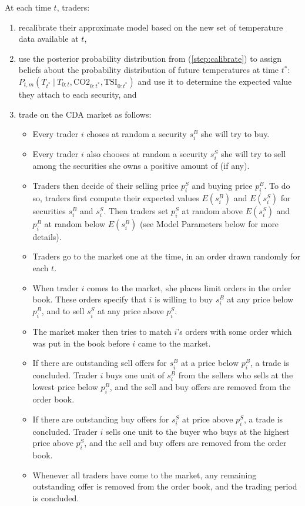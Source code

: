 \documentclass{wscpaperproc}\usepackage[]{graphicx}\usepackage[]{color}
\begin{document}
 At each time $t$, traders:
\begin{enumerate}
\item  recalibrate their approximate model based on the new set of temperature data available at $t$,
\label{step:calibrate}
\item  use the posterior probability distribution from (\ref{step:calibrate}) to 
assign beliefs about the probability distribution of future temperatures at time $t^*$: 
$P_{t,m}({T}_{t^*} ~|~ {T}_{0:t}, \text{CO2}_{0:t^*}, \text{TSI}_{0:t^*})$ 
and use it to determine the expected value they attach to each security, and
\item  trade on the CDA market as follows: 
  \begin{itemize}
    \item Every trader $i$ choses at random a security $s_i^B$ she will try to buy.
    \item Every trader $i$ also chooses at random a security $s_i^S$ she will try to sell among the securities she owns a positive amount of (if any).
    \item Traders then decide of their selling price $p_i^S$ and buying price $p_i^B$. 
  To do so, traders first compute their expected values $E(s_i^B)$ and $E(s_i^S)$ for securities $s_i^B$ and $s_i^S$. 
  Then traders set $p_i^S$ at random above $E(s_i^S)$ and $p_i^B$ at random below $E(s_i^B)$ (see Model Parameters below for more details).
    \item Traders go to the market one at the time, in an order drawn randomly for each $t$.
    \item When trader $i$ comes to the market, she places limit orders in the order book. 
   These orders specify that $i$ is willing to buy $s_i^B$ at any price below $p_i^B$, and to sell $s_i^S$ at any price above $p_i^S$.
    \item The market maker then tries to match $i$'s orders with some order which was put in the book before $i$ came to the market.
    \item If there are  outstanding sell offers for $s_i^B$ at a price below $p_i^B$, a trade is concluded. 
   Trader $i$ buys one unit of $s_i^B$ from the sellers who sells at the lowest price below $p_i^B$, and the sell and buy offers are removed from the order book.
    \item If there are outstanding buy offers for $s_i^S$ at price above $p_i^S$, a trade is concluded. 
   Trader $i$ sells one unit to the buyer who buys at the highest price above $p_i^S$, and the sell and buy offers are removed from the order book.
    \item Whenever all traders have come to the market, any remaining outstanding offer is removed from the order book, and the trading period is concluded. 
  \end{itemize}
\end{enumerate}
\end{document}

